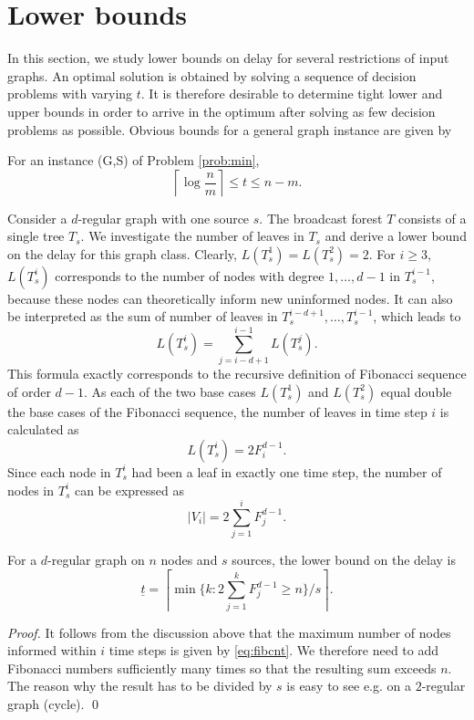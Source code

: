 \section{Lower bounds}
In this section, we study lower bounds on delay for several restrictions of input graphs.
An optimal solution is obtained by solving a sequence of decision problems with varying $t$. 
It is therefore desirable to determine tight lower and upper bounds in order to arrive in the optimum after solving as few decision problems as possible.
Obvious bounds for a general graph instance are given by
\begin{observation}
For an instance (G,S) of Problem \ref{prob:min},
$$\left\lceil\log\frac{n}{m}\right\rceil\leq t \leq n-m.$$
\end{observation}

Consider a $d$-regular graph with one source $s$.
The broadcast forest $T$ consists of a single tree $T_s$.
We investigate the number of leaves in $T_s$ and derive a lower bound on the delay for this graph class.
Clearly, $L(T^1_s)=L(T^2_s)=2$.
For $i\geq 3$, $L(T^i_s)$ corresponds to the number of nodes with degree $1,\dots,d-1$ in $T^{i-1}_s$, because these nodes can theoretically inform new uninformed nodes.
It can also be interpreted as the sum of number of leaves in $T^{i-d+1}_s,\dots,T^{i-1}_s$, which leads to %
\begin{equation*}
\label{eq:leafrec}
L(T^i_s)=\sum\limits_{j=i-d+1}^{i-1} L(T^j_s).
\end{equation*}  
This formula exactly corresponds to the recursive definition of Fibonacci sequence of order $d-1$.
As each of the two base cases $L(T^1_s)$ and $L(T^2_s)$ equal double the base cases of the Fibonacci sequence, the number of leaves in time step $i$ is calculated as
\begin{equation*}
\label{eq:fibleaf}
L(T^i_s)=2 F^{d-1}_i.
\end{equation*}  
Since each node in $T^i_s$ had been a leaf in exactly one time step, the number of nodes in $T^i_s$ can be expressed as 
\begin{equation}
\label{eq:fibcnt}
|V_i|=2\sum\limits_{j=1}^i F^{d-1}_j.
\end{equation}

\begin{proposition}
For a $d$-regular graph on $n$ nodes and $s$ sources, the lower bound on the delay is 
\begin{equation*}
\label{lem:lbreg1}
\underline{t}=\left\lceil\min\{k:2\sum\limits_{j=1}^k F^{d-1}_j\geq n\}/s\right\rceil.
\end{equation*}
\end{proposition}
\begin{proof}
It follows from the discussion above that the maximum number of nodes informed within $i$ time steps is given by \eqref{eq:fibcnt}.
We therefore need to add Fibonacci numbers sufficiently many times so that the resulting sum exceeds $n$.
The reason why the result has to be divided by $s$ is easy to see e.g. on a $2$-regular graph (cycle).
 \qed
\end{proof}

